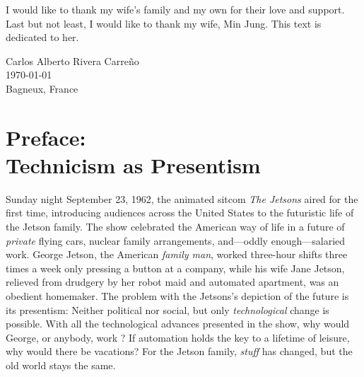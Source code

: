 
I would like to thank my wife's family and my own for their love and
support. Last but not least, I would like to thank my wife, Min Jung. This
text is dedicated to her.

\vspace{2\baselineskip}
\begin{FlushRight}
  Carlos Alberto Rivera Carreño\\
  \today\\
  Bagneux, France
\end{FlushRight}





\chapter[Preface]{Preface:\\ Technicism as Presentism} 


Sunday night September 23, 1962, the animated sitcom \textit{The Jetsons}
aired for the first time, introducing audiences across the United States to
the futuristic life of the Jetson family. The show celebrated the American
way of life in a future of \textit{private} flying cars, nuclear family
arrangements, and---oddly enough---salaried work. George Jetson, the
American \textit{family man}, worked three-hour shifts three times a week
only pressing a button at a company, while his wife Jane Jetson, relieved
from drudgery by her robot maid and automated apartment, was an obedient
homemaker. The problem with the Jetsons's depiction of the future is its
presentism: Neither political nor social, but only \textit{technological}
change is possible. With all the technological advances presented in the
show, why would George, or anybody, work ? If automation holds the key to a
lifetime of leisure, why would there be vacations? For the Jetson family,
\textit{stuff} has changed, but the old world stays the same.

